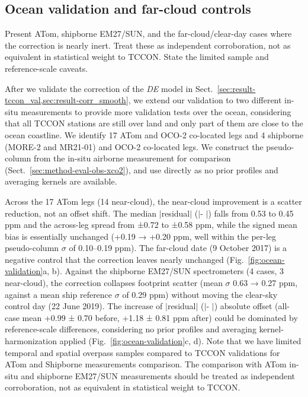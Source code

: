 \subsection{Ocean validation and far-cloud controls}
\label{sec:result-ocean_far_cldl}

Present ATom, shipborne EM27/SUN, and the far-cloud/clear-day cases where the
correction is nearly inert. Treat these as independent corroboration, not as
equivalent in statistical weight to TCCON. State the limited sample and
reference-scale caveats.


After we validate the correction of the \emph{DE} model in Sect.~\ref{sec:result-tccon_val,sec:result-corr_smooth}, we extend our validation to two different in-situ measurements to provide more validation tests over the ocean, considering that all TCCON stations are still over land and only part of them are close to the ocean coastline. We identify 17 ATom and OCO-2 co-located legs and 4 shipborne (MORE-2 and MR21-01) and OCO-2 co-located legs. We construct the pseudo-column \xcoatom from the in-situ airborne \xco measurement for comparison (Sect.~\ref{sec:method-eval-obs-xco2}), and use \xcoship directly as no prior profiles and averaging kernels are available.


Across the 17 ATom legs (14 near-cloud), the near-cloud improvement is a scatter reduction, not an offset shift. The median $|$residual$|$ ($|$\xcooco - \xcoatom$|$) falls from 0.53 to 0.45 ppm and the across-leg spread from ±0.72 to ±0.58 ppm, while the signed mean bias is essentially unchanged (+0.19 → +0.20 ppm, well within the per-leg pseudo-column $\sigma$ of 0.10–0.19 ppm). The far-cloud date (9 October 2017) is a negative control that the correction leaves nearly unchanged (Fig.~\ref{fig:ocean-validation}a, b). Against the shipborne EM27/SUN spectrometers (4 cases, 3 near-cloud), the correction collapses footprint scatter (mean $\sigma$ 0.63 → 0.27 ppm, against a mean ship reference $\sigma$ of 0.29 ppm) without moving the clear-sky control day (22 June 2019). The increase of $|$residual$|$ ($|$\xcooco - \xcoship$|$) absolute offset (all-case mean +0.99 ± 0.70 before, +1.18 ± 0.81 ppm after) could be dominated by reference-scale differences, considering no prior profiles and averaging kernel-harmonization applied  (Fig.~\ref{fig:ocean-validation}c, d). Note that we have limited temporal and spatial overpass samples compared to TCCON validations for ATom and Shipborne measurements comparison. The comparison with ATom in-situ and shipborne EM27/SUN measurements should be treated as independent corroboration, not as equivalent in statistical weight to TCCON.


